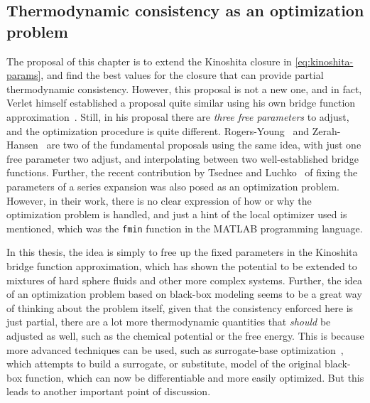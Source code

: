 \subsection{Thermodynamic consistency as an optimization problem}
The proposal of this chapter is to extend the Kinoshita closure in 
\autoref{eq:kinoshita-params}, and find the best values for the closure that can provide 
partial thermodynamic consistency. However, this proposal is not a new one, and in fact, 
Verlet himself established a proposal quite similar using his own bridge function 
approximation~\cite{verletIntegralEquationsClassical1981}. Still, in his proposal there 
are \emph{three free parameters} to adjust, and the optimization procedure is quite 
different. Rogers-Young~\cite{rogersNewThermodynamicallyConsistent1984b} and 
Zerah-Hansen~\cite{zerahSelfConsistentIntegral1986} are two of the fundamental proposals 
using the same idea, with just one free parameter two adjust, and interpolating between two 
well-established bridge functions. Further, the recent contribution by Tsednee and 
Luchko~\cite{tsedneeClosureOrnsteinZernikeEquation2019} of fixing the parameters of a 
series expansion was also posed as an optimization problem. However, in their work, there 
is no clear expression of how or why the optimization problem is handled, and just a hint 
of the local optimizer used is mentioned, which was the \verb|fmin| function in the 
MATLAB programming language.

In this thesis, the idea is simply to free up the fixed parameters in the Kinoshita bridge 
function approximation, which has shown the potential to be extended to mixtures of hard 
sphere fluids and other more complex systems. Further, the idea of an optimization 
problem based on black-box modeling seems to be a great way of thinking about the problem 
itself, given that the consistency enforced here is just partial, there are a lot more 
thermodynamic quantities that \emph{should} be adjusted as well, such as the chemical 
potential or the free energy. This is because more advanced techniques can be used, such as 
surrogate-base optimization~\cite{forresterRecentAdvancesSurrogatebased2009}, which 
attempts to build a surrogate, or substitute, model of the original black-box function, 
which can now be differentiable and more easily optimized. But this leads to another 
important point of discussion.


